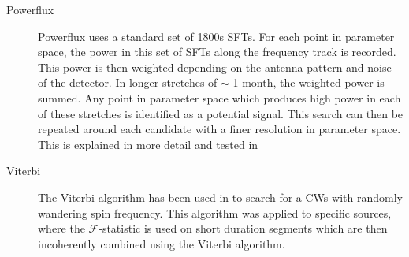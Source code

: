 \begin{description}
	
	\item[Powerflux] Powerflux uses a standard set of 1800s \glspl{SFT}. For each point in parameter space, the power in this set of \glspl{SFT} along the frequency track is recorded. This power is then weighted depending on the antenna pattern and noise of the detector. In longer stretches of $\sim$ 1 month, the weighted power is summed. Any point in parameter space which produces high power in each of these stretches is identified as a potential signal. This search can then be repeated around each candidate with a finer resolution in parameter space. This is explained in more detail and tested in \citep{abadie2012AllskySearch,walsh2016ComparisonMethods,ligoscientificcollaborationandvirgocollaboration2016ComprehensiveAllsky}
	
	\item[Viterbi] The Viterbi algorithm \citep{viterbi1967ErrorBounds} has been used in \citep{sun2018HiddenMarkov, suvorova2017HiddenMarkov,abbott2017SearchGravitational, abbott2018SearchGravitational, sun2018ApplicationHidden} to search for a \glspl{CW} with randomly wandering spin frequency. This algorithm was applied to specific sources, where the $\mathcal{F}$-statistic is used on short duration segments which are then incoherently combined using the Viterbi algorithm.
	
	
\end{description}


